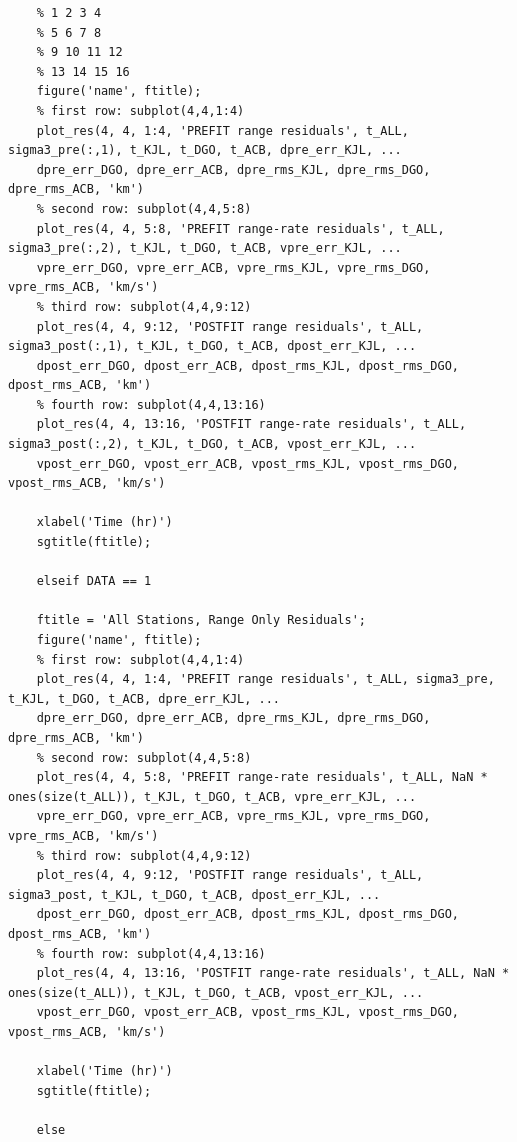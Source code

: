 \documentclass[conf]{new-aiaa}
\begin{document}
\begin{lstlisting}
	% 1 2 3 4 
	% 5 6 7 8 
	% 9 10 11 12 
	% 13 14 15 16 
	figure('name', ftitle); 
	% first row: subplot(4,4,1:4) 
	plot_res(4, 4, 1:4, 'PREFIT range residuals', t_ALL, sigma3_pre(:,1), t_KJL, t_DGO, t_ACB, dpre_err_KJL, ... 
	dpre_err_DGO, dpre_err_ACB, dpre_rms_KJL, dpre_rms_DGO, dpre_rms_ACB, 'km')
	% second row: subplot(4,4,5:8)
	plot_res(4, 4, 5:8, 'PREFIT range-rate residuals', t_ALL, sigma3_pre(:,2), t_KJL, t_DGO, t_ACB, vpre_err_KJL, ... 
	vpre_err_DGO, vpre_err_ACB, vpre_rms_KJL, vpre_rms_DGO, vpre_rms_ACB, 'km/s')
	% third row: subplot(4,4,9:12) 
	plot_res(4, 4, 9:12, 'POSTFIT range residuals', t_ALL, sigma3_post(:,1), t_KJL, t_DGO, t_ACB, dpost_err_KJL, ... 
	dpost_err_DGO, dpost_err_ACB, dpost_rms_KJL, dpost_rms_DGO, dpost_rms_ACB, 'km')
	% fourth row: subplot(4,4,13:16)
	plot_res(4, 4, 13:16, 'POSTFIT range-rate residuals', t_ALL, sigma3_post(:,2), t_KJL, t_DGO, t_ACB, vpost_err_KJL, ... 
	vpost_err_DGO, vpost_err_ACB, vpost_rms_KJL, vpost_rms_DGO, vpost_rms_ACB, 'km/s')
	
	xlabel('Time (hr)') 
	sgtitle(ftitle); 
	
	elseif DATA == 1
	
	ftitle = 'All Stations, Range Only Residuals'; 
	figure('name', ftitle); 
	% first row: subplot(4,4,1:4) 
	plot_res(4, 4, 1:4, 'PREFIT range residuals', t_ALL, sigma3_pre, t_KJL, t_DGO, t_ACB, dpre_err_KJL, ... 
	dpre_err_DGO, dpre_err_ACB, dpre_rms_KJL, dpre_rms_DGO, dpre_rms_ACB, 'km')
	% second row: subplot(4,4,5:8)
	plot_res(4, 4, 5:8, 'PREFIT range-rate residuals', t_ALL, NaN * ones(size(t_ALL)), t_KJL, t_DGO, t_ACB, vpre_err_KJL, ... 
	vpre_err_DGO, vpre_err_ACB, vpre_rms_KJL, vpre_rms_DGO, vpre_rms_ACB, 'km/s')
	% third row: subplot(4,4,9:12) 
	plot_res(4, 4, 9:12, 'POSTFIT range residuals', t_ALL, sigma3_post, t_KJL, t_DGO, t_ACB, dpost_err_KJL, ... 
	dpost_err_DGO, dpost_err_ACB, dpost_rms_KJL, dpost_rms_DGO, dpost_rms_ACB, 'km')
	% fourth row: subplot(4,4,13:16)
	plot_res(4, 4, 13:16, 'POSTFIT range-rate residuals', t_ALL, NaN * ones(size(t_ALL)), t_KJL, t_DGO, t_ACB, vpost_err_KJL, ... 
	vpost_err_DGO, vpost_err_ACB, vpost_rms_KJL, vpost_rms_DGO, vpost_rms_ACB, 'km/s')
	
	xlabel('Time (hr)') 
	sgtitle(ftitle); 
	
	else
	

\end{lstlisting}
\end{document}
